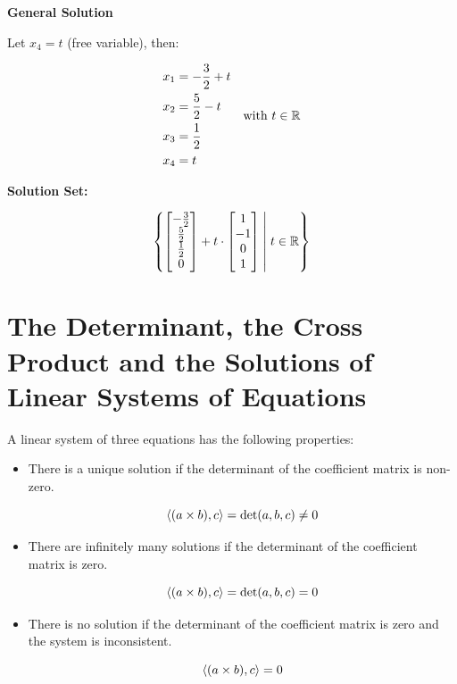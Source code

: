 \textbf{General Solution}

Let \(x_4 = t\) (free variable), then:

\[
    \begin{aligned}
        x_1 & = -\frac{3}{2} + t \\
        x_2 & = \frac{5}{2} - t  \\
        x_3 & = \frac{1}{2}      \\
        x_4 & = t
    \end{aligned}
    \quad \text{with } t \in \mathbb{R}
\]

\textbf{Solution Set:}

\[
    \left\{
    \begin{bmatrix}
        -\frac{3}{2} \\ \frac{5}{2} \\ \frac{1}{2} \\ 0
    \end{bmatrix}
    + t \cdot
    \begin{bmatrix}
        1 \\ -1 \\ 0 \\ 1
    \end{bmatrix}
    \;\middle|\; t \in \mathbb{R}
    \right\}
\]

\section{The Determinant, the Cross Product and the Solutions of Linear Systems of Equations}

A linear system of three equations has the following properties:

\begin{itemize}

    \item There is a unique solution if the determinant of the coefficient matrix is non-zero.

          \[
              \left\langle(a \times b), c\right\rangle = \det(a,b,c) \ne 0
          \]

    \item There are infinitely many solutions if the determinant of the coefficient matrix is zero.

          \[
              \left\langle(a \times b), c\right\rangle = \det(a,b,c) = 0
          \]

    \item There is no solution if the determinant of the coefficient matrix is zero and the system is inconsistent.

          \[
              \left\langle(a \times b), c\right\rangle = 0
          \]

\end{itemize}

